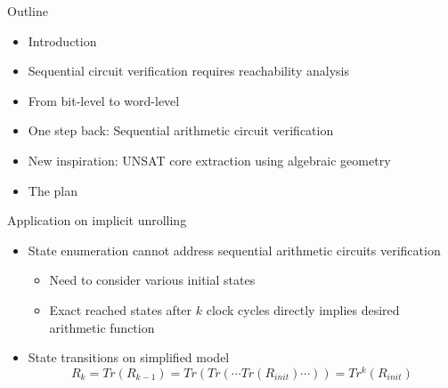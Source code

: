 \documentclass[xcolor=dvipsnames]{beamer}
\newcommand{\bi}{\begin{itemize}}
\newcommand{\ei}{\end{itemize}}
\begin{document}
\begin{frame}{\large{Outline}}
\bi
\item Introduction
\item Sequential circuit verification requires reachability analysis
\item From bit-level to word-level
\item \alert{One step back: Sequential arithmetic circuit verification}
\item New inspiration: UNSAT core extraction using algebraic geometry
\item The plan
\ei
\end{frame}
\begin{frame}{\large{Application on implicit unrolling}}
\vspace{-0.1in}
\begin{figure}[hbt]
\end{figure}
\vspace{-0.2in}
\bi
\item State enumeration cannot address sequential arithmetic circuits verification
	\bi
	\item Need to consider various initial states
	\item Exact reached states after $k$ clock cycles directly implies desired arithmetic function
	\ei
\item State transitions on simplified model
$$R_{k} = Tr(R_{k-1}) = Tr(Tr(\cdots Tr(R_{init})\cdots)) = Tr^k(R_{init})$$
\ei
\end{frame}
\end{document}

